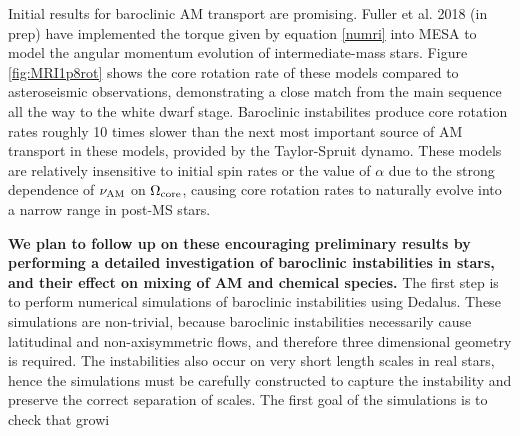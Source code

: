 Initial results for baroclinic AM transport are promising. Fuller et al. 2018 (in prep) have implemented the torque given by equation \ref{numri} into MESA to model the angular momentum evolution of intermediate-mass stars. Figure \ref{fig:MRI1p8rot} shows the core rotation rate of these models compared to asteroseismic observations, demonstrating a close match from the main sequence all the way to the white dwarf stage. Baroclinic instabilites produce core rotation rates roughly 10 times slower than the next most important source of AM transport in these models, provided by the Taylor-Spruit dynamo. These models are relatively insensitive to initial spin rates or the value of $\alpha$ due to the strong dependence of $\nu_{\rm AM}$ on $\Omega_{\rm core}$, causing core rotation rates to naturally evolve into a narrow range in post-MS stars.

{\bf We plan to follow up on these encouraging preliminary results by performing a detailed investigation of baroclinic instabilities in stars, and their effect on mixing of AM and chemical species.} The first step is to perform numerical simulations of baroclinic instabilities using Dedalus. These simulations are non-trivial, because baroclinic instabilities necessarily cause latitudinal and non-axisymmetric flows, and therefore three dimensional geometry is required. The instabilities also occur on very short length scales in real stars, hence the simulations must be carefully constructed to capture the instability and preserve the correct separation of scales. The first goal of the simulations is to check that growi